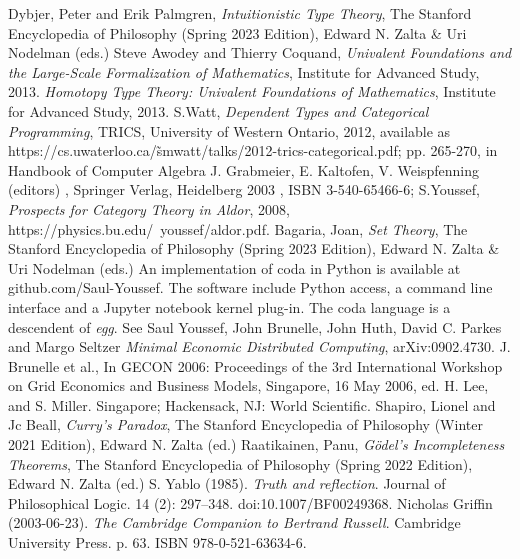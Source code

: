 \documentclass[11pt]{article}
\begin{document}
\begin{thebibliography}{10}
 Dybjer, Peter and Erik Palmgren, {\it Intuitionistic Type Theory}, The Stanford Encyclopedia of Philosophy (Spring 2023 Edition), Edward N. Zalta \& Uri Nodelman (eds.)
 Steve Awodey and Thierry Coquand, {\it Univalent Foundations and the Large-Scale Formalization of Mathematics}, Institute for Advanced Study, 2013.
 {\it Homotopy Type Theory: Univalent Foundations of Mathematics}, Institute for Advanced Study, 2013.
 S.Watt, {\it Dependent Types and Categorical Programming}, TRICS, University of Western Ontario, 2012, available as {\rm https://cs.uwaterloo.ca/\~smwatt/talks/2012-trics-categorical.pdf}; pp. 265-270, in Handbook of Computer Algebra J. Grabmeier, E. Kaltofen, V. Weispfenning (editors) , Springer Verlag, Heidelberg 2003 , ISBN 3-540-65466-6; S.Youssef, {\it Prospects for Category Theory in Aldor}, 2008, {\rm https://physics.bu.edu/~youssef/aldor.pdf}.
 Bagaria, Joan, {\it Set Theory}, The Stanford Encyclopedia of Philosophy (Spring 2023 Edition), Edward N. Zalta \& Uri Nodelman (eds.)
 An implementation of coda in Python is available at github.com/Saul-Youssef.  The software include Python access, a command line 
interface and a Jupyter notebook kernel plug-in.  
 The coda language is a descendent of {\it egg}.  See Saul Youssef, John Brunelle, John Huth, David C. Parkes and Margo Seltzer {\it Minimal Economic Distributed Computing}, arXiv:0902.4730.  J. Brunelle et al., In GECON 2006: Proceedings of the 3rd International Workshop on Grid Economics and Business Models, Singapore, 16 May 2006, ed. H. Lee, and S. Miller. Singapore; Hackensack, NJ: World Scientific.
 Shapiro, Lionel and Jc Beall, {\it Curry’s Paradox}, The Stanford Encyclopedia of Philosophy (Winter 2021 Edition), Edward N. Zalta (ed.)
 Raatikainen, Panu, {\it Gödel’s Incompleteness Theorems}, The Stanford Encyclopedia of Philosophy (Spring 2022 Edition), Edward N. Zalta (ed.)
 S. Yablo (1985). {\it Truth and reflection}. Journal of Philosophical Logic. 14 (2): 297–348. doi:10.1007/BF00249368.
 Nicholas Griffin (2003-06-23). {\it The Cambridge Companion to Bertrand Russell}. Cambridge University Press. p. 63. ISBN 978-0-521-63634-6.
\end{thebibliography}
\end{document}
